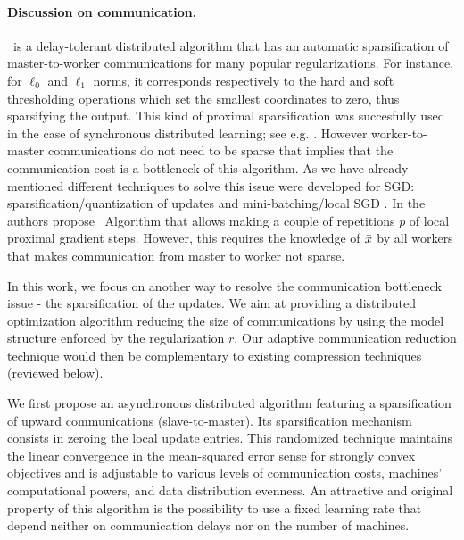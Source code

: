 {\color{blue}
\paragraph{Discussion on communication.}
\dave~is a delay-tolerant distributed algorithm that has an automatic sparsification of master-to-worker communications for many popular regularizations. For instance, for $\ell_0$ and $\ell_1$ norms, it corresponds respectively to the hard and soft thresholding operations which set the smallest coordinates to zero, thus sparsifying the output. This kind of proximal sparsification was succesfully used in the case of synchronous distributed learning; see e.g. \cite{wang2017efficient,smith2015l1}. However worker-to-master communications do not need to be sparse that implies that the communication cost is a bottleneck of this algorithm. As we have already mentioned different techniques to solve this issue were developed for SGD: sparsification/quantization of updates \cite{horvath2019stochastic} and mini-batching/local SGD \cite{yang2013trading, khaled2019first}. In \cite{mishchenko2018,ICML18} the authors propose \daveR~Algorithm that allows making a couple of repetitions $p$ of local proximal gradient steps. However, this requires the knowledge of $\bar{x}$ by all workers that makes communication from master to worker not sparse.

In this work, we focus on another way to resolve the communication bottleneck issue - the sparsification of the updates. We aim at providing a distributed optimization algorithm reducing the size of communications by using the model structure enforced by the regularization $r$. Our adaptive communication reduction technique would then be complementary to existing compression techniques (reviewed below).

We first propose an asynchronous distributed algorithm featuring a sparsification of upward communications (slave-to-master). Its sparsification mechanism consists in {\color{red}{randomly and independly}} zeroing the local update entries. This randomized technique maintains the linear convergence in the mean-squared error sense for strongly convex objectives {\color{red}{when difference in probabilities of coordinates to be selected is small enough}} and is adjustable to various levels of communication costs, machines' computational powers, and data distribution evenness. An attractive and original property of this algorithm is the possibility to use a fixed learning rate that depend neither on communication delays nor on the number of machines.

}

